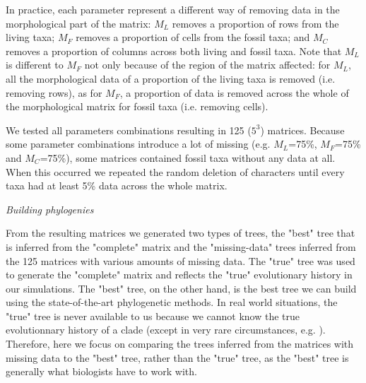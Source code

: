 \documentclass[12pt,letterpaper]{article}
\renewcommand{\subsection}[1]{%
\bigskip
\begin{center}
\begin{large}
\normalfont\itshape #1
\end{large}
\end{center}}
\begin{document}
In practice, each parameter represent a different way of removing data in the morphological part of the matrix: $M_{L}$ removes a proportion of rows from the living taxa; $M_{F}$ removes a proportion of cells from the fossil taxa; and $M_{C}$ removes a proportion of columns across both living and fossil taxa.
Note that $M_{L}$ is different to $M_{F}$ not only because of the region of the matrix affected: for $M_{L}$, all the morphological data of a proportion of the living taxa is removed (i.e. removing rows), as for $M_{F}$, a proportion of data is removed across the whole of the morphological matrix for fossil taxa (i.e. removing cells).

We tested all parameters combinations resulting in 125 ($5^3$) matrices.
Because some parameter combinations introduce a lot of missing (e.g. $M_L$=75\%, $M_F$=75\% and $M_C$=75\%), some matrices contained fossil taxa without any data at all.
When this occurred we repeated the random deletion of characters until every taxa had at least 5\% data across the whole matrix.


\subsection{Building phylogenies}
From the resulting matrices we generated two types of trees, the "best" tree that is inferred from the "complete" matrix and the "missing-data" trees inferred from the 125 matrices with various amounts of missing data.
The "true" tree was used to generate the "complete" matrix and reflects the "true" evolutionary history in our simulations.
The "best" tree, on the other hand, is the best tree we can build using the state-of-the-art phylogenetic methods.
In real world situations, the "true" tree is never available to us because we cannot know the true evolutionnary history of a clade (except in very rare circumstances, e.g. \citet{rozen2005}).
Therefore, here we focus on comparing the trees inferred from the matrices with missing data to the "best" tree, rather than the "true" tree, as the "best" tree is generally what biologists have to work with.
\end{document}
